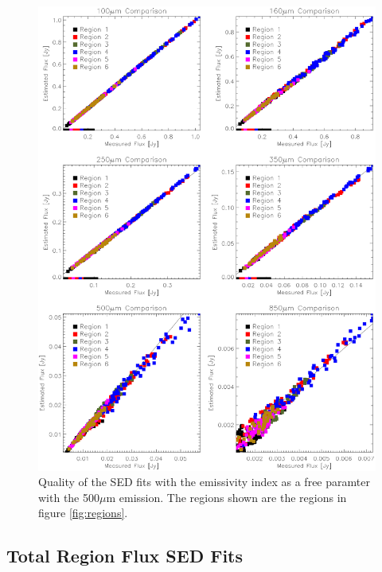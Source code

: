 \begin{figure}
  \centering
  \includegraphics[width=1.\textwidth]{sed_imgs/flux_compare_free_5.eps}
  \caption[Emissivity as a Free Parameter SED Fit Quality using the 500$\mu$m Data]{Quality of the SED fits with the emissivity index as a free paramter with the 500$\mu$m emission.  The regions shown are the regions in figure \ref{fig:regions}.}
  \label{fig:wf_5}
\end{figure}

\subsection{Total Region Flux SED Fits}

